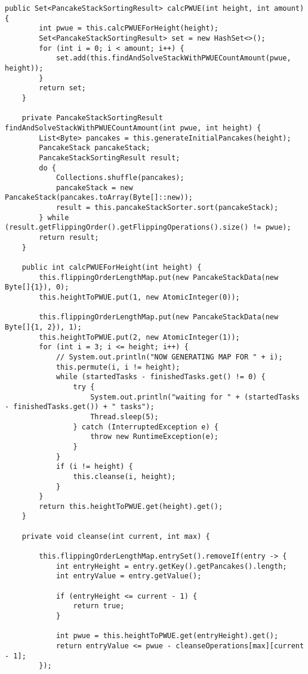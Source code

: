 \begin{lstlisting}[label={lst:source}]
    public Set<PancakeStackSortingResult> calcPWUE(int height, int amount) {
        int pwue = this.calcPWUEForHeight(height);
        Set<PancakeStackSortingResult> set = new HashSet<>();
        for (int i = 0; i < amount; i++) {
            set.add(this.findAndSolveStackWithPWUECountAmount(pwue, height));
        }
        return set;
    }

    private PancakeStackSortingResult findAndSolveStackWithPWUECountAmount(int pwue, int height) {
        List<Byte> pancakes = this.generateInitialPancakes(height);
        PancakeStack pancakeStack;
        PancakeStackSortingResult result;
        do {
            Collections.shuffle(pancakes);
            pancakeStack = new PancakeStack(pancakes.toArray(Byte[]::new));
            result = this.pancakeStackSorter.sort(pancakeStack);
        } while (result.getFlippingOrder().getFlippingOperations().size() != pwue);
        return result;
    }

    public int calcPWUEForHeight(int height) {
        this.flippingOrderLengthMap.put(new PancakeStackData(new Byte[]{1}), 0);
        this.heightToPWUE.put(1, new AtomicInteger(0));

        this.flippingOrderLengthMap.put(new PancakeStackData(new Byte[]{1, 2}), 1);
        this.heightToPWUE.put(2, new AtomicInteger(1));
        for (int i = 3; i <= height; i++) {
            // System.out.println("NOW GENERATING MAP FOR " + i);
            this.permute(i, i != height);
            while (startedTasks - finishedTasks.get() != 0) {
                try {
                    System.out.println("waiting for " + (startedTasks - finishedTasks.get()) + " tasks");
                    Thread.sleep(5);
                } catch (InterruptedException e) {
                    throw new RuntimeException(e);
                }
            }
            if (i != height) {
                this.cleanse(i, height);
            }
        }
        return this.heightToPWUE.get(height).get();
    }

    private void cleanse(int current, int max) {

        this.flippingOrderLengthMap.entrySet().removeIf(entry -> {
            int entryHeight = entry.getKey().getPancakes().length;
            int entryValue = entry.getValue();

            if (entryHeight <= current - 1) {
                return true;
            }

            int pwue = this.heightToPWUE.get(entryHeight).get();
            return entryValue <= pwue - cleanseOperations[max][current - 1];
        });


\end{lstlisting}
